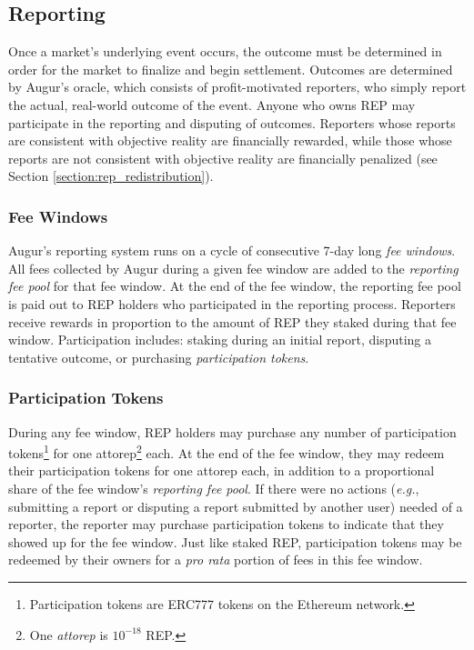 \documentclass[floatfix,reprint,nofootinbib,amsmath,amssymb,epsfig,pre,floats,letterpaper,groupedaffiliation]{revtex4-1}
\theoremstyle{definition}
\theoremstyle{definition}
\begin{document}
\subsection{Reporting}\label{section:reporting}

Once a market's underlying event occurs, the outcome must be determined in order for the market to finalize and begin settlement.  Outcomes are determined by Augur's oracle, which consists of profit-motivated reporters, who simply report the actual, real-world outcome of the event.  Anyone who owns REP may participate in the reporting and disputing of outcomes.  Reporters whose reports are consistent with objective reality are financially rewarded, while those whose reports are not consistent with objective reality are financially penalized (see Section \ref{section:rep_redistribution}).

\subsubsection{Fee Windows}

Augur's reporting system runs on a cycle of consecutive 7-day long \textit{fee windows}.  All fees collected by Augur during a given fee window are added to the \textit{reporting fee pool} for that fee window.  At the end of the fee window, the reporting fee pool is paid out to REP holders who participated in the reporting process.  Reporters receive rewards in proportion to the amount of REP they staked during that fee window.  Participation includes: staking during an initial report, disputing a tentative outcome, or purchasing \textit{participation tokens}.

\subsubsection{Participation Tokens}

During any fee window, REP holders may purchase any number of participation tokens\footnote{Participation tokens are ERC777 tokens on the Ethereum network.} for one attorep\footnote{One \textit{attorep} is $10^{-18}$ REP.} each.  At the end of the fee window, they may redeem their participation tokens for one attorep each, in addition to a proportional share of the fee window's \textit{reporting fee pool}.  If there were no actions (\textit{e.g.}, submitting a report or disputing a report submitted by another user) needed of a reporter, the reporter may purchase participation tokens to indicate that they showed up for the fee window.  Just like staked REP, participation tokens may be redeemed by their owners for a \textit{pro rata} portion of fees in this fee window.
\end{document}
